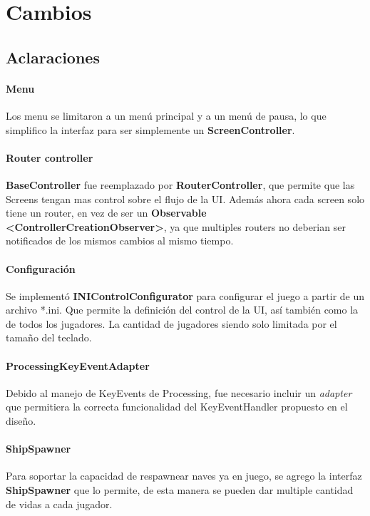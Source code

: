 \documentclass[a4paper,10pt]{extarticle}
\begin{document}
\section{Cambios}
    \subsection{Aclaraciones}
        \paragraph{Menu}
        Los menu se limitaron a un menú principal y a un menú de pausa, lo que simplifico la interfaz para ser simplemente un \textbf{ScreenController}.

        \paragraph{Router controller}
        \textbf{BaseController} fue reemplazado por \textbf{RouterController}, que permite que las Screens tengan mas control sobre el flujo de la UI. Además ahora cada screen solo tiene un router, en vez de ser un \textbf{Observable \textless ControllerCreationObserver\textgreater}, ya que multiples routers no deberian ser notificados de los mismos cambios al mismo tiempo.

        \paragraph{Configuración}
        Se implementó \textbf{INIControlConfigurator} para configurar el juego a partir de un archivo *.ini. Que permite la definición del control de la UI, así también como la de todos los jugadores. La cantidad de jugadores siendo solo limitada por el tamaño del teclado.

        \paragraph{ProcessingKeyEventAdapter}
        Debido al manejo de KeyEvents de Processing, fue necesario incluir un \textit{adapter} que permitiera la correcta funcionalidad del KeyEventHandler propuesto en el diseño.

        \paragraph{ShipSpawner}
        Para soportar la capacidad de respawnear naves ya en juego, se agrego la interfaz \textbf{ShipSpawner} que lo permite, de esta manera se pueden dar multiple cantidad de vidas a cada jugador.
\end{document}
